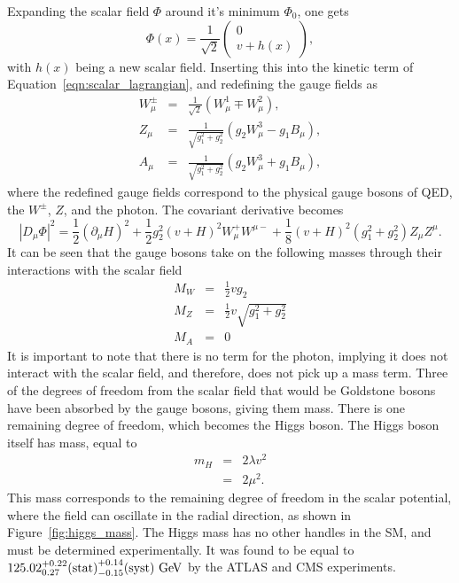 Expanding the scalar field $\Phi$ around it's minimum $\Phi_0$, one gets
\begin{equation}
  \Phi(x) = \frac{1}{\sqrt{2}} \begin{pmatrix} 0 \\ v + h(x) \end{pmatrix},
\end{equation}
with $h(x)$ being a new scalar field.
Inserting this into the kinetic term of Equation~\ref{eqn:scalar_lagrangian},
and redefining the gauge fields as
\begin{eqnarray}
  W_{\mu}^{\pm} & = & \frac{1}{\sqrt{2}}
                      \left( W_{\mu}^{1} \mp W_{\mu}^{2} \right),
  \\
  Z_{\mu} & = & \frac{1}{\sqrt{g_1^2 + g_2^2}}
                \left( g_2 W_{\mu}^{3} - g_1 B_{\mu} \right),
  \\
  A_{\mu} & = & \frac{1}{\sqrt{g_1^2 + g_2^2}}
                \left( g_2 W_{\mu}^{3} + g_1 B_{\mu} \right),
\end{eqnarray}
where the redefined gauge fields correspond to the physical gauge bosons
of QED, the $W^{\pm}$, $Z$, and the photon.
The covariant derivative becomes
\begin{equation}
  \left| D_{\mu}\Phi \right|^2 =
  \frac{1}{2} \left( \partial_{\mu} H \right)^2 +
  \frac{1}{2} g_{2}^{2} \left(v + H\right)^2 W_{\mu}^{+}W^{\mu -} +
  \frac{1}{8} \left(v + H\right)^2 \left(g_{1}^{2} + g_{2}^{2} \right)
    Z_{\mu}Z^{\mu}.
\end{equation}
It can be seen that the gauge bosons take on the following masses through their
interactions with the scalar field
\begin{eqnarray}
  M_{W} &=& \frac{1}{2} v g_2 \\
  M_{Z} &=& \frac{1}{2} v \sqrt{g_1^2 + g_2^2} \\
  M_{A} &=& 0
\end{eqnarray}
It is important to note that there is no term for the photon, implying it does
not interact with the scalar field, and therefore, does not pick up a mass
term.
Three of the degrees of freedom from the scalar field that would be Goldstone
bosons have been absorbed by the gauge bosons, giving them mass.
There is one remaining degree of freedom, which becomes the Higgs boson.
The Higgs boson itself has mass, equal to
\begin{eqnarray}
  m_H &=& 2 \lambda v^2 \\
      &=& 2\mu^2.
\end{eqnarray}
This mass corresponds to the remaining degree of freedom in the scalar
potential, where the field can oscillate in the radial direction, as shown in
Figure~\ref{fig:higgs_mass}.
The Higgs mass has no other handles in the SM, and must be determined
experimentally.
It was found to be equal to
$125.02^{+0.22}_{0.27}\mathrm{(stat)}^{+0.14}_{-0.15}\mathrm{(syst)} \GeV$
by the ATLAS and CMS experiments.

